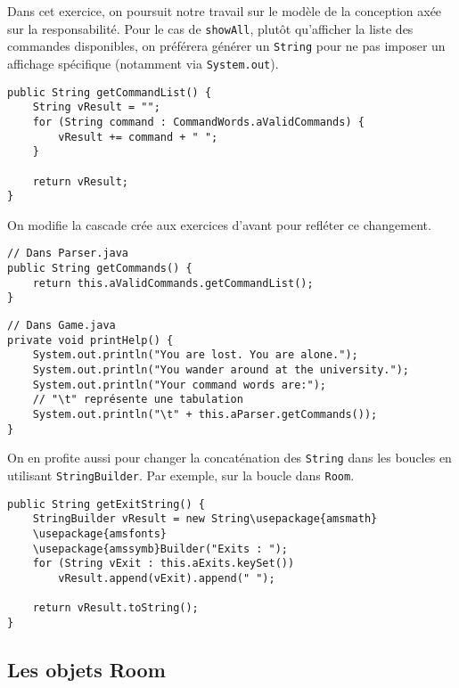\begin{exercise}[subtitle=getCommandList]

Dans cet exercice, on poursuit notre travail sur le modèle de la conception axée sur la responsabilité. Pour le cas de \verb|showAll|, plutôt qu'afficher la liste des commandes disponibles, on préférera générer un \verb|String| pour ne pas imposer un affichage spécifique (notamment via \verb|System.out|).

\begin{verbatim}
public String getCommandList() {
    String vResult = "";
    for (String command : CommandWords.aValidCommands) {
        vResult += command + " ";
    }

    return vResult;
}
\end{verbatim}

On modifie la cascade crée aux exercices d'avant pour refléter ce changement.

\begin{verbatim}
// Dans Parser.java
public String getCommands() {
    return this.aValidCommands.getCommandList();
}
\end{verbatim}

\begin{verbatim}
// Dans Game.java
private void printHelp() {
    System.out.println("You are lost. You are alone.");
    System.out.println("You wander around at the university.");
    System.out.println("Your command words are:");
    // "\t" représente une tabulation
    System.out.println("\t" + this.aParser.getCommands());
}
\end{verbatim}

On en profite aussi pour changer la concaténation des \verb|String| dans les boucles en utilisant \verb|StringBuilder|. Par exemple, sur la boucle dans \verb|Room|.

\begin{verbatim}
public String getExitString() {
    StringBuilder vResult = new String\usepackage{amsmath}
    \usepackage{amsfonts}
    \usepackage{amssymb}Builder("Exits : ");
    for (String vExit : this.aExits.keySet())
        vResult.append(vExit).append(" ");

    return vResult.toString();
}
\end{verbatim}

\subsection*{Les objets Room}


\end{exercise}
